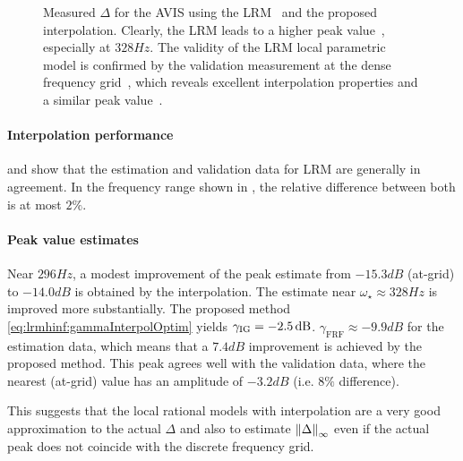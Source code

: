 \begin{figure}[p]
 \centering
    \setlength{\figurewidth}{0.7\columnwidth}
    \setlength{\figureheight}{0.68\figurewidth}
   
 \caption[$\Delta$ of the , estimated using local modeling (detail).]{Measured $\Delta$ for the \gls{AVIS} using the \gls{LRM}~ and the proposed interpolation. Clearly, the \gls{LRM} leads to a higher peak value~, especially at $328\unit{Hz}$. The validity of the LRM local parametric model is confirmed by the validation measurement at the dense frequency grid~, which reveals excellent interpolation properties and a similar peak value~.}
\label{fig:lrmhinf:avisMeasZoom}
\end{figure}

\paragraph*{Interpolation performance}
\label{sec:lrmhinf:avis-interpol}
 and  show that the estimation and validation data for \gls{LRM} are generally in agreement.
In the frequency range shown in , the relative difference between both is at most $2\%$.

\paragraph*{Peak value estimates}
\label{sec:lrmhinf:avis-peak-value}
Near $296\unit{Hz}$, a modest improvement of the peak estimate from $-15.3 \unit{dB}$ (at-grid) to $-14.0 \unit{dB}$ is obtained by the interpolation.
The estimate near $\omega_{\star} \approx 328\unit{Hz}$ is improved more substantially.
The proposed method \eqref{eq:lrmhinf:gammaInterpolOptim} yields $\gamma_{\mathrm{IG}}=-2.5\,\mathrm{dB}$.
$\gamma_{\mathrm{FRF}}\approx -9.9\unit{dB}$ for the estimation data, which means that a $7.4\unit{dB}$ improvement is achieved by the proposed method.
This peak agrees well with the validation data, where the nearest (at-grid) value has an amplitude of $-3.2\unit{dB}$ (i.e. $8\%$ difference).

This suggests that the local rational models with interpolation are a very good approximation to the actual $\Delta$ and also to estimate $\left\| \Delta \right\|_{\infty}$ even if the actual peak does not coincide with the discrete frequency grid.

